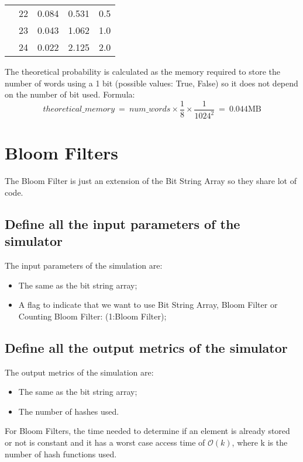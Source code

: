 \documentclass[twocolumn,letterpaper]{report}
\begin{document}
{\begin{table}[h!]
\begin{tabular}{|c|c|c|c|c|}
						                                                                                     & 22 & 0.084        & 0.531 & 0.5  \\ \cline{2-5} 
						                                                                                     & 23 & 0.043        & 1.062 & 1.0  \\ \cline{2-5} 
						                                                                                     & 24 & 0.022        & 2.125 & 2.0 \\ \hline
				\end{tabular}
		\end{table}
		The theoretical probability is calculated as the memory required to store the number of words using a 1 bit (possible values: True, False) so it does not depend on the number of bit used. Formula:
		\[ theoretical\_memory \: = \: num\_words \times \frac{1}{8} \times \frac{1}{1024^2} \: = \: 0.044 \text{MB}\]
		
		
		\newpage
		
					\section{Bloom Filters}	 
	 				The Bloom Filter is just an extension of the Bit String Array so they share lot of code. 
				\subsection{Define all the input parameters of the simulator}
					The input parameters of the simulation are:
					\begin{itemize}
						\item The same as the bit string array;
						\item A flag to indicate that we want to use Bit String Array, Bloom Filter or Counting Bloom Filter: (1:Bloom Filter);
					\end{itemize}
					 
				\subsection{Define all the output metrics of the simulator}
				The output metrics of the simulation are:
				\begin{itemize}
					\item The same as the bit string array;
					\item The number of hashes used.
				\end{itemize}
			For Bloom Filters, the time needed to determine if an element is already stored or not is constant and it has a worst case access time of $\mathcal{O}(k)$, where k is the number of hash functions used.
			
}
\end{document}
